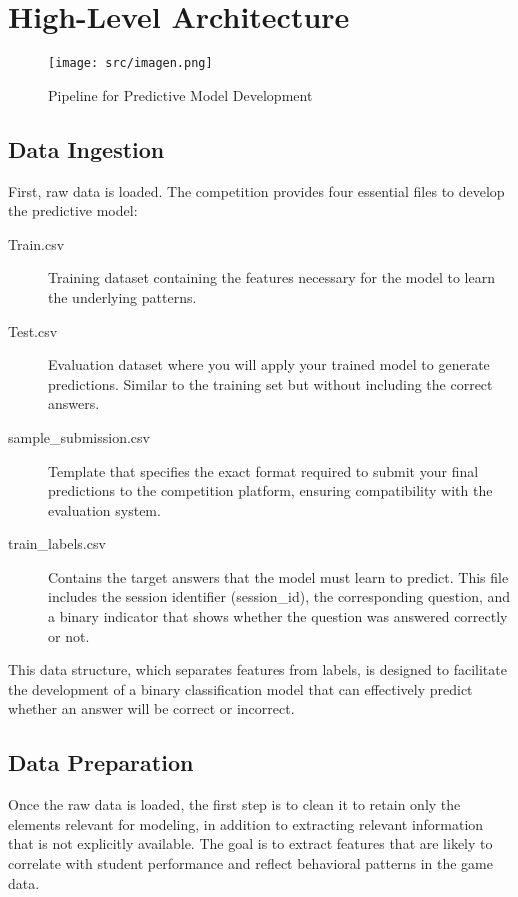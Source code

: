 \documentclass{article}
\begin{document}
\section{High-Level Architecture}

\begin{figure}[H]
    \centering
    \texttt{[image: src/imagen.png]}
    \caption{Pipeline for Predictive Model Development}
\end{figure}
    
\subsection*{Data Ingestion}

First, raw data is loaded. The competition provides four essential files to develop the predictive model:

\begin{description}
  \item[Train.csv] Training dataset containing the features necessary for the model to learn the underlying patterns.
  
  \item[Test.csv] Evaluation dataset where you will apply your trained model to generate predictions. Similar to the training set but without including the correct answers.
  
  \item[sample\_submission.csv] Template that specifies the exact format required to submit your final predictions to the competition platform, ensuring compatibility with the evaluation system.
  
  \item[train\_labels.csv] Contains the target answers that the model must learn to predict. This file includes the session identifier (session\_id), the corresponding question, and a binary indicator that shows whether the question was answered correctly or not.
\end{description}

This data structure, which separates features from labels, is designed to facilitate the development of a binary classification model that can effectively predict whether an answer will be correct or incorrect.

\subsection*{Data Preparation}

Once the raw data is loaded, the first step is to clean it to retain only the elements relevant for modeling, in addition to extracting relevant information that is not explicitly available. The goal is to extract features that are likely to correlate with student performance and reflect behavioral patterns in the game data.
\end{document}

